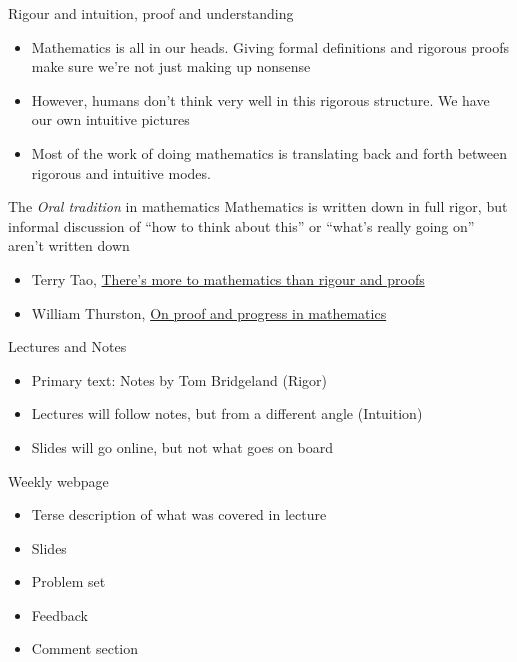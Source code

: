 \documentclass{beamer}
\begin{document}
\begin{frame}{Rigour and intuition, proof and understanding}

\begin{itemize}
\item Mathematics is all in our heads.  Giving formal definitions and rigorous proofs make sure we're not just making up nonsense
\item However, humans don't think very well in this rigorous structure.  We have our own intuitive pictures
\item Most of the work of doing mathematics is translating back and forth between rigorous and intuitive modes.
\end{itemize}


\begin{block}{The \emph{Oral tradition} in mathematics}
Mathematics is written down in full rigor, but informal discussion of ``how to think about this'' or  ``what's really going on'' aren't written down
\end{block}


\begin{itemize}
\item Terry Tao, \href{https://terrytao.wordpress.com/career-advice/there’s-more-to-mathematics-than-rigour-and-proofs/}{There's more to mathematics than rigour and proofs}
\item William Thurston, \href{https://arxiv.org/abs/math/9404236}{On proof and progress in mathematics}
\end{itemize}


\end{frame}


\begin{frame}{Lectures and Notes}
\begin{itemize}
\item  Primary text: Notes by Tom Bridgeland (Rigor)
\item  Lectures will follow notes, but from a different angle (Intuition)
\item  Slides will go online, but not what goes on board
\end{itemize}

\begin{block}{Weekly webpage}
\begin{itemize}
\item Terse description of what was covered in lecture
\item Slides
\item Problem set
\item Feedback
\item Comment section

\end{itemize}
\end{block}
\end{frame}
\end{document}
